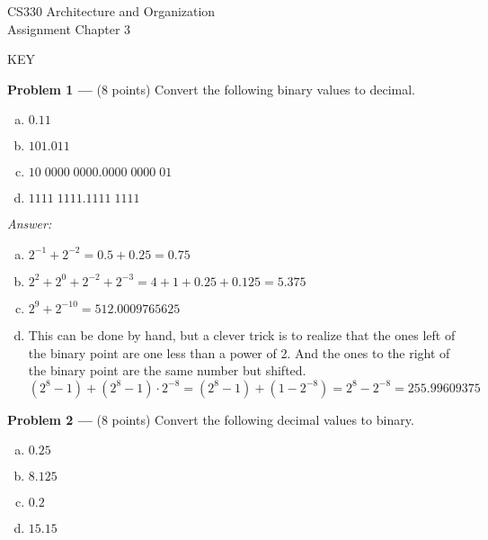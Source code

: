 \documentclass[11pt]{article}
\newcommand{\problem}[1]{\textbf{Problem #1 ---} }
\newcommand{\answer}{{\color{red}\textit{Answer: }}}
\begin{document}
\thispagestyle{empty}

\begin{center}
{\large CS330 Architecture and Organization}\\
Assignment Chapter 3
\end{center}

\begin{flushright}
KEY %
\end{flushright}

\problem{1}(8 points) Convert the following binary values to decimal.
\begin{enumerate}[(a)]
    \item $0.11$
    \item $101.011$
    \item $10\;0000\;0000.0000\;0000\;01$
    \item $1111\;1111.1111\;1111$
\end{enumerate}

\answer
{\color{blue}
\begin{enumerate}[(a)]
    \item $2^{-1} + 2^{-2} = 0.5 + 0.25 = 0.75$
    \item $2^{2} + 2^{0} + 2^{-2} +2^{-3} = 4 + 1 + 0.25 + 0.125 = 5.375$
    \item $2^9 + 2^{-10} = 512.0009765625$
    \item This can be done by hand, but a clever trick is to realize that the ones left of the binary point are one less than a power of 2.  And the ones to the right of the binary point are the same number but shifted.\\
	$(2^8-1) + (2^8-1)\cdot 2^{-8} = (2^8 - 1) + (1 - 2^{-8}) = 2^8 - 2^{-8} = 255.99609375$
\end{enumerate}
}

\problem{2}(8 points) Convert the following decimal values to binary.
\begin{enumerate}[(a)]
    \item $0.25$
    \item $8.125$
    \item $0.2$
    \item $15.15$
\end{enumerate}
\end{document}
